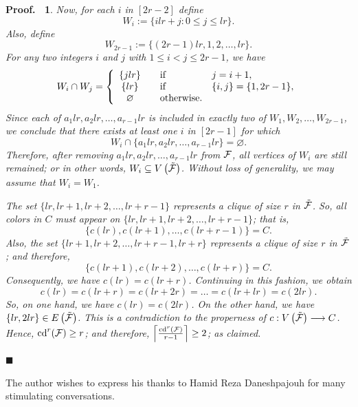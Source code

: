 \documentclass[11pt]{article}
\newtheorem{preproof}{{\bf Proof.\ }}
\newenvironment{proof}[1]{\begin{preproof}{\rm
               #1}\hfill{$\blacksquare$}}{\end{preproof}}
\begin{document}
\begin{proof}
{	\noindent Now, for each $i$ in $[2r-2]$ define
	$$W_{i} := \{ ilr + j : 0\leq j \leq lr\}.$$
	Also, define
	$$W_{2r-1} := \{(2r-1)lr , 1, 2 , \dots , lr\}.$$
	For any two integers $i$ and $j$ with $1\leq i < j \leq 2r-1$, we have
	$$W_{i} \cap W_{j} = \left\{
	\begin{array}[3]{clll}
		\{jlr\}        &      &   {\rm if}            &   j=i+1,     \\
		\{lr\}         &      &   {\rm if}            &   \{i,j\}=\{1,2r-1\},    \\
		\varnothing    &      &   {\rm otherwise.}    &       
	\end{array}\right.$$
    Since each of $a_{1}lr , a_{2}lr , \dots , a_{r-1}lr$ is included in exactly two of
    $W_{1} , W_{2}, \dots , W_{2r-1}$,
    we conclude that there exists at least one $i$ in $[2r-1]$ for which
    $$W_{i} \cap \{a_{1}lr , a_{2}lr , \dots , a_{r-1}lr\} = \varnothing .$$
    Therefore, after removing $a_{1}lr , a_{2}lr , \dots , a_{r-1}lr$ from ${\cal F}$,
    all vertices of $W_{i}$ are still remained; or in other words, $W_{i} \subseteq V \left(  \tilde{{\cal F}}  \right)$.
    Without loss of generality, we may assume that $W_{i} = W_{1}$.
    
    \noindent The set $\{lr , lr+1 , lr+2 , \dots , lr+r-1\}$ represents a clique of size
    $r$ in $\tilde{{\cal F}}$. So, all colors in $C$ must appear on 
    $\{lr , lr+1 , lr+2 , \dots , lr+r-1\}$; that is, 
    $$\{c(lr) , c(lr+1) , \dots , c(lr+r-1)\} = C.$$
    Also, the set $\{lr+1 , lr+2 , \dots , lr+r-1 , lr+r\}$ represents a clique of size
    $r$ in $\tilde{{\cal F}}$; and therefore, 
    $$\{c(lr+1) , c(lr+2) , \dots , c(lr+r)\} = C.$$
    Consequently, we have $c(lr) = c(lr+r)$.
    Continuing in this fashion, we obtain
    $$c(lr) = c(lr+r) = c(lr+2r) = \dots = c(lr+lr) = c(2lr).$$
    So, on one hand, we have $c(lr) = c(2lr)$.
    On the other hand, we have $\{lr, 2lr\} \in E \left(  \tilde{\cal F}   \right)$.
    This is a contradiction to the properness of $c: V \left(  \tilde{{\cal F}} \right) \longrightarrow C$.
    Hence, ${\rm cd}^r ({\cal F}) \geq r$; and therefore, $\left\lceil \frac{{\rm cd}^r ({\cal F})}{r-1} \right\rceil  \geq 2$;
    as claimed.    
}
\end{proof}

 The author wishes to express his thanks to Hamid Reza Daneshpajouh for many stimulating conversations.
\end{document}
